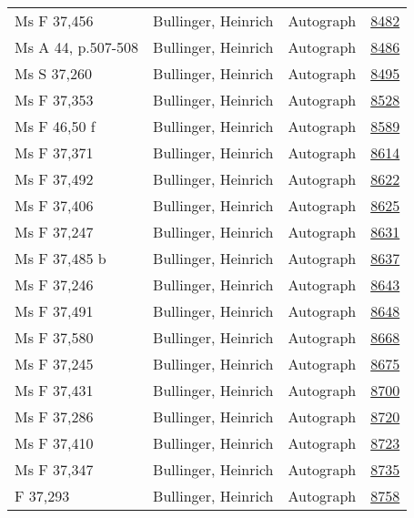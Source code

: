 \documentclass[10pt,a4paper,landscape]{report}
\begin{document}
\begin{longtable}{p{16cm}p{4cm}lr}
Ms F 37,456	&	Bullinger, Heinrich	&	Autograph	&	\href{http://130.60.24.72/assignment/8482}{8482}\\
Ms A 44, p.507-508	&	Bullinger, Heinrich	&	Autograph	&	\href{http://130.60.24.72/assignment/8486}{8486}\\
Ms S 37,260	&	Bullinger, Heinrich	&	Autograph	&	\href{http://130.60.24.72/assignment/8495}{8495}\\
Ms F 37,353	&	Bullinger, Heinrich	&	Autograph	&	\href{http://130.60.24.72/assignment/8528}{8528}\\
Ms F 46,50 f	&	Bullinger, Heinrich	&	Autograph	&	\href{http://130.60.24.72/assignment/8589}{8589}\\
Ms F 37,371	&	Bullinger, Heinrich	&	Autograph	&	\href{http://130.60.24.72/assignment/8614}{8614}\\
Ms F 37,492	&	Bullinger, Heinrich	&	Autograph	&	\href{http://130.60.24.72/assignment/8622}{8622}\\
Ms F 37,406	&	Bullinger, Heinrich	&	Autograph	&	\href{http://130.60.24.72/assignment/8625}{8625}\\
Ms F 37,247	&	Bullinger, Heinrich	&	Autograph	&	\href{http://130.60.24.72/assignment/8631}{8631}\\
Ms F 37,485 b	&	Bullinger, Heinrich	&	Autograph	&	\href{http://130.60.24.72/assignment/8637}{8637}\\
Ms F 37,246	&	Bullinger, Heinrich	&	Autograph	&	\href{http://130.60.24.72/assignment/8643}{8643}\\
Ms F 37,491	&	Bullinger, Heinrich	&	Autograph	&	\href{http://130.60.24.72/assignment/8648}{8648}\\
Ms F 37,580	&	Bullinger, Heinrich	&	Autograph	&	\href{http://130.60.24.72/assignment/8668}{8668}\\
Ms F 37,245	&	Bullinger, Heinrich	&	Autograph	&	\href{http://130.60.24.72/assignment/8675}{8675}\\
Ms F 37,431	&	Bullinger, Heinrich	&	Autograph	&	\href{http://130.60.24.72/assignment/8700}{8700}\\
Ms F 37,286	&	Bullinger, Heinrich	&	Autograph	&	\href{http://130.60.24.72/assignment/8720}{8720}\\
Ms F 37,410	&	Bullinger, Heinrich	&	Autograph	&	\href{http://130.60.24.72/assignment/8723}{8723}\\
Ms F 37,347	&	Bullinger, Heinrich	&	Autograph	&	\href{http://130.60.24.72/assignment/8735}{8735}\\
F 37,293	&	Bullinger, Heinrich	&	Autograph	&	\href{http://130.60.24.72/assignment/8758}{8758}\\

\end{longtable}
\end{document}
